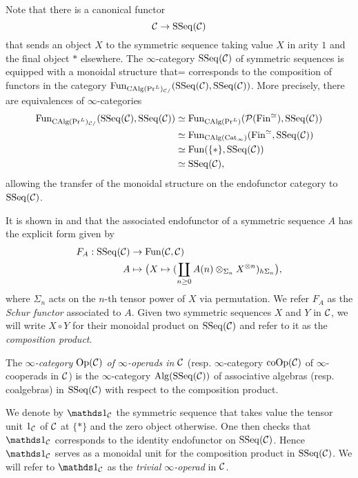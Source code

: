 \begin{remark}
Note that there is a canonical functor 
\[
{\mathcal{C}} \to \operatorname{SSeq}({\mathcal{C}})
\]
that sends an object $X$ to the symmetric sequence taking value $X$ in arity $1$ and the final object $*$ elsewhere. 
The $\infty$-category $\operatorname{SSeq}({\mathcal{C}})$ of symmetric sequences is equipped with a monoidal structure that= corresponds to the composition of functors in the category $\operatorname{Fun}_{\operatorname{CAlg}(\Pr^L)_{{\mathcal{C}}/}}(\operatorname{SSeq}({\mathcal{C}}),\operatorname{SSeq}({\mathcal{C}}))$. More precisely, there are equivalences of $\infty$-categories
\begin{align*}
	\operatorname{Fun}_{\operatorname{CAlg}(\Pr^L)_{{\mathcal{C}}/}}(\operatorname{SSeq}({\mathcal{C}}),\operatorname{SSeq}({\mathcal{C}}))
	& \simeq 
\operatorname{Fun}_{\operatorname{CAlg}(\Pr^L)}({\mathcal{P}}(\operatorname{Fin}^{\simeq}),\operatorname{SSeq}({\mathcal{C}}))\\
& \simeq
\operatorname{Fun}_{\operatorname{CAlg}(\operatorname{Cat}_{\infty})}(\operatorname{Fin}^{\simeq},\operatorname{SSeq}({\mathcal{C}}))\\
& \simeq \operatorname{Fun}(\{*\}, \operatorname{SSeq}({\mathcal{C}}))\\
& \simeq \operatorname{SSeq}({\mathcal{C}}),
\end{align*}
allowing the transfer of the monoidal structure on the endofunctor category to $\operatorname{SSeq}({\mathcal{C}})$.
\end{remark}


It is shown in \cite{Haugsengsymseq} and \cite{BrantnerPhD} that the associated endofunctor of a symmetric sequence $A$ has the explicit form given by
\begin{align*}
		F_{A}: \operatorname{SSeq}({\mathcal{C}}) & \rightarrow \operatorname{Fun}({\mathcal{C}},{\mathcal{C}})\\
	A        & \mapsto \big( X\mapsto  (\coprod_{n\geq 0} A(n)\otimes_{\Sigma_n} X^{\otimes n})_{h\Sigma_n}\big),
\end{align*}
where $\Sigma_n$ acts on the $n$-th tensor power of $X$ via permutation.
We refer $F_{A}$ as the \emph{Schur functor} associated to $A$.
Given two symmetric sequences $X$ and $Y$ in ${\mathcal{C}}$, we will write $X\circ Y$ for their monoidal product on $\operatorname{SSeq}({\mathcal{C}})$ and refer to it as the \emph{composition product}.


\begin{definition}
	\label{inf operads}
	The \emph{$\infty$-category $\operatorname{Op}({\mathcal{C}})$ of $\infty$-operads in ${\mathcal{C}}$} (resp. $\infty$-category $\operatorname{coOp}({\mathcal{C}})$ of $\infty$-cooperads in ${\mathcal{C}}$) is the $\infty$-category $\operatorname{Alg}(\operatorname{SSeq}({\mathcal{C}}))$ of associative algebras (resp. coalgebras) in $\operatorname{SSeq}({\mathcal{C}})$ with respect to the composition product.
\end{definition}

\begin{remark}
	We denote by $\triv_{\CC}$ the symmetric sequence that takes value the tensor unit $1_{\mathcal{C}}$ of ${\mathcal{C}}$ at $\{*\}$ and the zero object otherwise. One then checks that $\triv_{\CC}$ corresponds to the identity endofunctor on $\operatorname{SSeq}({\mathcal{C}})$. Hence $\triv_{\CC}$ serves as a monoidal unit for the composition product in $\operatorname{SSeq}({\mathcal{C}})$.
	We will refer to $\triv_{\CC}$ as the \emph{trivial $\infty$-operad} in ${\mathcal{C}}$.
\end{remark}


